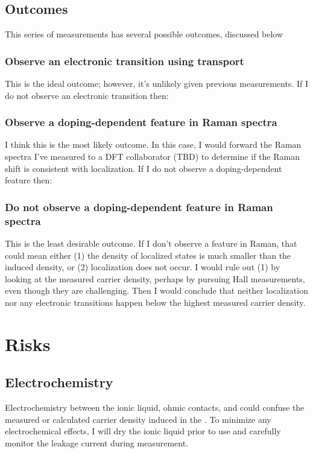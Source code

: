 \documentclass[11pt]{article}
\begin{document}
\begin{multicols}{2}
\subsection{Outcomes}

This series of measurements has several possible outcomes, discussed below

\subsubsection{Observe an electronic transition using transport}
This is the ideal outcome; however, it's unlikely given previous measurements. If I do not observe an electronic transition then:

\subsubsection{Observe a doping-dependent feature in Raman spectra}
I think this is the most likely outcome. In this case, I would forward the Raman spectra I've measured to a DFT collaborator (TBD) to determine if the Raman shift is consistent with localization. If I do not observe a doping-dependent feature then:

\subsubsection{Do not observe a doping-dependent feature in Raman spectra}
This is the least desirable outcome. If I don't observe a feature in Raman, that could mean either (1) the density of localized states is much smaller than the induced density, or (2) localization does not occur. I would rule out (1) by looking at the measured carrier density, perhaps by pursuing Hall measurements, even though they are challenging. Then I would conclude that neither localization nor any electronic transitions happen below the highest measured carrier density.

\section{Risks}

\subsection{Electrochemistry}
Electrochemistry between the ionic liquid, ohmic contacts, and \rucl could confuse the measured or calculated carrier density induced in the \ruclnospace. To minimize any electrochemical effects, I will dry the ionic liquid prior to use and carefully monitor the leakage current during measurement.


\end{multicols}
\end{document}
